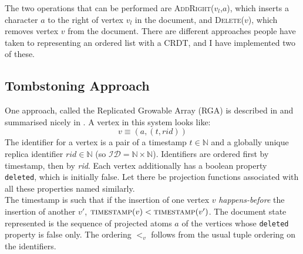 \documentclass[diss.tex]{subfiles}
\begin{document}
The two operations that can be performed are \textsc{AddRight}($v_l$,$a$), which inserts a character $a$ to the right of vertex $v_l$ in the document, and \textsc{Delete}($v$), which removes vertex $v$ from the document.
There are different approaches people have taken to representing an ordered list with a CRDT, and I have implemented two of these.
%
%

%
\subsection{Tombstoning Approach}
One approach, called the Replicated Growable Array (RGA) is described in \cite{rga} and summarised nicely in \cite{shapstudy}. A vertex in this system looks like:
$$ v \equiv (a, (t, rid))$$
 The identifier for a vertex is a pair of a timestamp $t \in \mathbb{N}$ and a globally unique replica identifier $rid \in \mathbb{N}$ (so $\mathcal{ID} = \mathbb{N} \times \mathbb{N}$). Identifiers are ordered first by timestamp, then by \textit{rid}. Each vertex additionally has a boolean property \texttt{deleted}, which is initially false. Let there be projection functions associated with all these properties named similarly.\\
The timestamp is such that if the insertion of one vertex $v$ \textit{happens-before} the insertion of another $v'$, $\textsc{timestamp}(v) < \textsc{timestamp}(v')$.
The document state represented is the sequence of projected atoms $a$ of the vertices whose \texttt{deleted} property is false only. The ordering $<_v$ follows from the usual tuple ordering on the identifiers.
\end{document}
